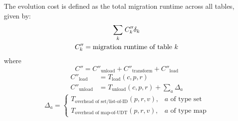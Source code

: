 \documentclass[preview,border=10pt]{standalone}
\begin{document}
\noindent The evolution cost is defined as the total migration runtime across all tables, given by:
\begin{gather*}
\sum_{k} \hspace{.1em} C''_{k} \delta_{k} \\
C''_{k} = \text{migration runtime of table } k
\end{gather*}
\noindent where
\begin{equation}
C'' = C''_\text{unload} + C''_\text{transform} + C''_\text{load}
\end{equation}
\begin{align}
    C''_\text{load} &= T_\text{load}(c,p,r) \\
    C''_\text{unload} &= T_\text{unload}(c,p,r) + \sum_a \Delta_a
\end{align}
\begin{equation}
\Delta_a =
\begin{cases}
    T_\text{overhead of set/list-of-ID}(p, r, v),
        & a \text{ of type set} \\
    T_\text{overhead of map-of-UDT}(p, r, v),
        & a \text{ of type map}
\end{cases}
\end{equation}
\end{document}

